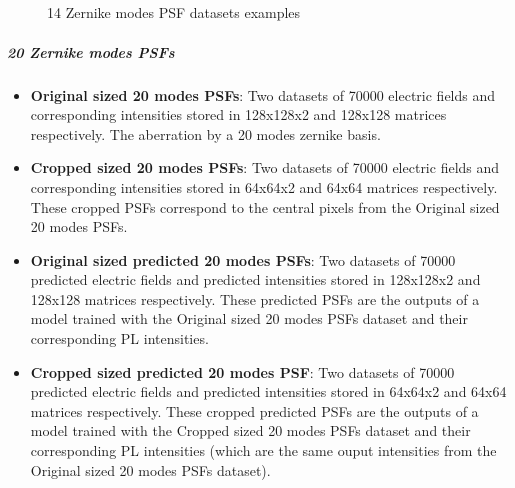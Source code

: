 			\begin{figure*}[ht!]
				\centering
				\\
					
				\\
					
				\\
					
				\\
			
			\caption{14 Zernike modes PSF datasets examples}
		\end{figure*}
			\FloatBarrier
			
			
			\subparagraph{20 Zernike modes PSFs}
			\begin{itemize}
				
				\item \textbf{Original sized 20 modes PSFs}: Two datasets of 70000 electric fields and corresponding intensities stored in 128x128x2 and 128x128 matrices respectively. The aberration by a 20 modes zernike basis.			
				\item \textbf{Cropped sized 20 modes PSFs}:  Two datasets of 70000 electric fields and corresponding intensities stored in 64x64x2 and 64x64 matrices respectively. These cropped  PSFs correspond to the central pixels from the Original sized 20 modes PSFs.
				\item \textbf{Original sized predicted 20 modes PSFs}:  Two datasets of 70000 predicted electric fields and predicted intensities stored in 128x128x2 and 128x128 matrices respectively. These predicted PSFs are the outputs of a model trained with the Original sized 20 modes PSFs dataset and their corresponding PL intensities.
				\item \textbf{Cropped sized predicted 20 modes PSF}: Two datasets of 70000 predicted electric fields and predicted intensities stored in 64x64x2 and 64x64 matrices respectively. These cropped predicted PSFs are the outputs of a model trained with the Cropped sized 20 modes PSFs dataset and their corresponding PL intensities (which are the same ouput intensities from the Original sized 20 modes PSFs dataset).
			\end{itemize}
			
